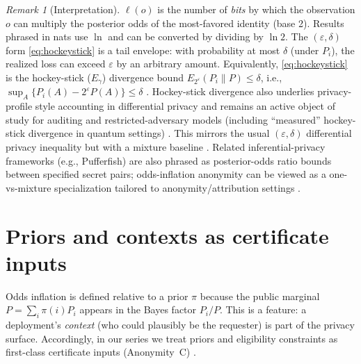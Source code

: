 \documentclass[11pt]{article}
\theoremstyle{definition}
\theoremstyle{remark}
\newtheorem{remark}{Remark}
\begin{document}
\begin{remark}[Interpretation]
$\ell(o)$ is the number of \emph{bits} by which the observation $o$ can multiply the posterior odds of the most-favored identity (base 2). Results phrased in nats use $\ln$ and can be converted by dividing by $\ln 2$.
The $(\varepsilon,\delta)$ form \eqref{eq:hockeystick} is a tail envelope: with probability at most $\delta$ (under $P_i$), the realized loss can exceed $\varepsilon$ by an arbitrary amount.
Equivalently, \eqref{eq:hockeystick} is the hockey-stick (\emph{$E_\gamma$}) divergence bound $E_{2^\varepsilon}(P_i\|P)\le\delta$, i.e., $\sup_A\{P_i(A)-2^\varepsilon P(A)\}\le\delta$ \cite{LiuCuffVerdu2017}.
Hockey-stick divergence also underlies privacy-profile style accounting in differential privacy and remains an active object of study for auditing and restricted-adversary models (including ``measured'' hockey-stick divergence in quantum settings) \cite{NuradhaMeasuredHockeyStick2025}.
This mirrors the usual $(\varepsilon,\delta)$ differential privacy inequality but with a mixture baseline \cite{DworkRoth2014}.
Related inferential-privacy frameworks (e.g., Pufferfish) are also phrased as posterior-odds ratio bounds between specified secret pairs; odds-inflation anonymity can be viewed as a one-vs-mixture specialization tailored to anonymity/attribution settings \cite{KiferMachanavajjhala2014Pufferfish}.
\end{remark}

\section{Priors and contexts as certificate inputs}\label{sec:priors}
Odds inflation is defined relative to a prior $\pi$ because the public marginal $P=\sum_i \pi(i)P_i$ appears in the Bayes factor $P_i/P$.
This is a feature: a deployment's \emph{context} (who could plausibly be the requester) is part of the privacy surface.
Accordingly, in our series we treat priors and eligibility constraints as first-class certificate inputs (Anonymity~C) \cite{series:abomoinl}.
\end{document}
